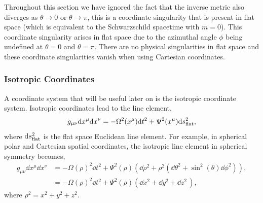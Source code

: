 Throughout this section we have ignored the fact that the inverse metric also diverges as $\theta\rightarrow 0$ or $\theta \rightarrow \pi$, this is a coordinate singularity that is present in flat space (which is equivalent to the Schwarzschild spacetime with $m=0$). This coordinate singularity arises in flat space due to the azimuthal angle $\phi$ being undefined at $\theta=0$ and $\theta=\pi$. There are no physical singularities in flat space and these coordinate singularities vanish when using Cartesian coordinates.




\subsubsection{Isotropic Coordinates}
A coordinate system that will be useful later on is the isotropic coordinate system. Isotropic coordinates lead to the line element,
\begin{align}
g_{\mu\nu} \dd x^\mu \dd x^\nu = -\Omega^2(x^\mu) \dd t^2 + \Psi^2(x^\mu) \dd s^2_{\rm flat},
\end{align}
where $\dd s^2_{\rm flat}$ is the flat space Euclidean line element. For example, in spherical polar and Cartesian spatial coordinates, the isotropic line element in spherical symmetry becomes,
\begin{align}
g_{\mu\nu} \dd x^\mu \dd x^\nu &= -\Omega(\rho)^2 \dd t^2 + \Psi^2(\rho) \left( \dd \rho^2 + \rho^2 \left( \dd \theta^2 + \sin^2(\theta) \dd \phi^2 \right)\right) ,\\
 &= -\Omega(\rho)^2 \dd t^2 + \Psi^2(\rho) \left( {\dd x^2 + \dd y^2 + \dd z^2 }\,\right),
\end{align}
where $\rho^2 = x^2 + y^2 + z^2$. 

